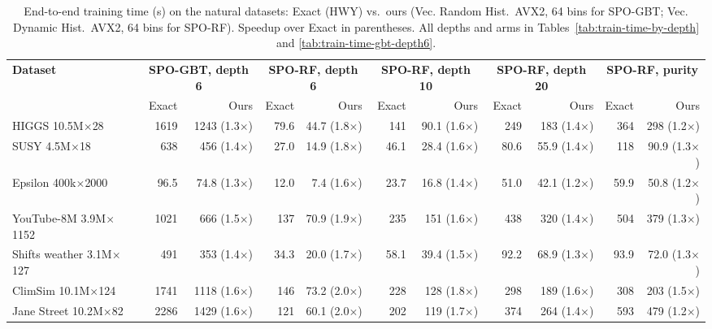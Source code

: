 \begin{table}[t]
    \centering
    \footnotesize
    \setlength{\tabcolsep}{3pt}
    \begin{tabular}{l|rr|rr|rr|rr|rr}
        \hline
        \multirow{2}{*}{\textbf{Dataset}} & \multicolumn{2}{c|}{\textbf{SPO-GBT, depth 6}} & \multicolumn{2}{c|}{\textbf{SPO-RF, depth 6}} & \multicolumn{2}{c|}{\textbf{SPO-RF, depth 10}} & \multicolumn{2}{c|}{\textbf{SPO-RF, depth 20}} & \multicolumn{2}{c}{\textbf{SPO-RF, purity}} \\
         & Exact & Ours & Exact & Ours & Exact & Ours & Exact & Ours & Exact & Ours \\
        \hline
        HIGGS 10.5M$\times$28 & 1619 & 1243 (1.3$\times$) & 79.6 & 44.7 (1.8$\times$) & 141 & 90.1 (1.6$\times$) & 249 & 183 (1.4$\times$) & 364 & 298 (1.2$\times$) \\
        SUSY 4.5M$\times$18 & 638 & 456 (1.4$\times$) & 27.0 & 14.9 (1.8$\times$) & 46.1 & 28.4 (1.6$\times$) & 80.6 & 55.9 (1.4$\times$) & 118 & 90.9 (1.3$\times$) \\
        Epsilon 400k$\times$2000 & 96.5 & 74.8 (1.3$\times$) & 12.0 & 7.4 (1.6$\times$) & 23.7 & 16.8 (1.4$\times$) & 51.0 & 42.1 (1.2$\times$) & 59.9 & 50.8 (1.2$\times$) \\
        YouTube-8M 3.9M$\times$1152 & 1021 & 666 (1.5$\times$) & 137 & 70.9 (1.9$\times$) & 235 & 151 (1.6$\times$) & 438 & 320 (1.4$\times$) & 504 & 379 (1.3$\times$) \\
        Shifts weather 3.1M$\times$127 & 491 & 353 (1.4$\times$) & 34.3 & 20.0 (1.7$\times$) & 58.1 & 39.4 (1.5$\times$) & 92.2 & 68.9 (1.3$\times$) & 93.9 & 72.0 (1.3$\times$) \\
        ClimSim 10.1M$\times$124 & 1741 & 1118 (1.6$\times$) & 146 & 73.2 (2.0$\times$) & 228 & 128 (1.8$\times$) & 298 & 189 (1.6$\times$) & 308 & 203 (1.5$\times$) \\
        Jane Street 10.2M$\times$82 & 2286 & 1429 (1.6$\times$) & 121 & 60.1 (2.0$\times$) & 202 & 119 (1.7$\times$) & 374 & 264 (1.4$\times$) & 593 & 479 (1.2$\times$) \\
        \hline
    \end{tabular}
    \caption{End-to-end training time (s) on the natural datasets: Exact (HWY) vs.\ ours (Vec. Random Hist.\ AVX2, 64 bins for SPO-GBT; Vec. Dynamic Hist.\ AVX2, 64 bins for SPO-RF). Speedup over Exact in parentheses. All depths and arms in Tables~\ref{tab:train-time-by-depth} and \ref{tab:train-time-gbt-depth6}.}
    \label{tab:train-time-natural}
\end{table}

